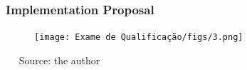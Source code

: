 \documentclass[xcolor=table]{beamer}
\begin{document}
\begin{frame}\frametitle{Implementation Proposal} 

	\begin{figure}[htb]
		\centering
		\texttt{[image: Exame de Qualificação/figs/3.png]}
		\label{fig:segmentation}
	\end{figure}
	~\flushright \tiny~ {Source: the author}
\end{frame}


%	
%	
%	
%	
%

%
%	
\end{document}
